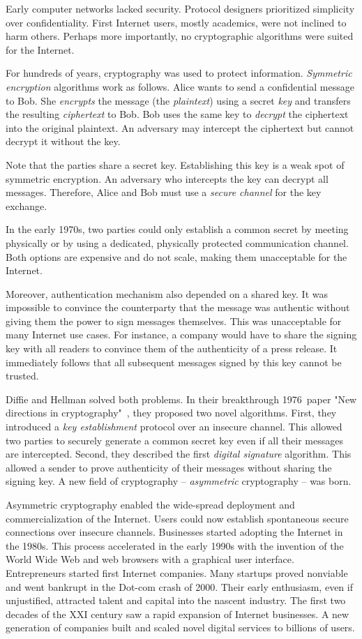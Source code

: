 Early computer networks lacked security.
Protocol designers prioritized simplicity over confidentiality.
First Internet users, mostly academics, were not inclined to harm others.
Perhaps more importantly, no cryptographic algorithms were suited for the Internet.

For hundreds of years, cryptography was used to protect information.
\textit{Symmetric encryption} algorithms work as follows.
Alice wants to send a confidential message to Bob.
She \textit{encrypts} the message (the \textit{plaintext}) using a secret \textit{key} and transfers the resulting \textit{ciphertext} to Bob.
Bob uses the same key to \textit{decrypt} the ciphertext into the original plaintext.
An adversary may intercept the ciphertext but cannot decrypt it without the key.

Note that the parties share a secret key.
Establishing this key is a weak spot of symmetric encryption.
An adversary who intercepts the key can decrypt all messages.
Therefore, Alice and Bob must use a \textit{secure channel} for the key exchange.

In the early 1970s, two parties could only establish a common secret by meeting physically or by using a dedicated, physically protected communication channel.
Both options are expensive and do not scale, making them unacceptable for the Internet.

Moreover, authentication mechanism also depended on a shared key.
It was impossible to convince the counterparty that the message was authentic without giving them the power to sign messages themselves.
This was unacceptable for many Internet use cases.
For instance, a company would have to share the signing key with all readers to convince them of the authenticity of a press release.
It immediately follows that all subsequent messages signed by this key cannot be trusted.

Diffie and Hellman solved both problems.
In their breakthrough 1976~paper "New directions in cryptography"~\cite{Diffie1976}, they proposed two novel algorithms.
First, they introduced a \textit{key establishment} protocol over an insecure channel.
This allowed two parties to securely generate a common secret key even if all their messages are intercepted.
Second, they described the first \textit{digital signature} algorithm.
This allowed a sender to prove authenticity of their messages without sharing the signing key.
A new field of cryptography -- \textit{asymmetric} cryptography -- was born.

Asymmetric cryptography enabled the wide-spread deployment and commercialization of the Internet.
Users could now establish spontaneous secure connections over insecure channels.
Businesses started adopting the Internet in the 1980s.
This process accelerated in the early 1990s with the invention of the World Wide Web and web browsers with a graphical user interface.
Entrepreneurs started first Internet companies.
Many startups proved nonviable and went bankrupt in the Dot-com crash of 2000.
Their early enthusiasm, even if unjustified, attracted talent and capital into the nascent industry.
The first two decades of the XXI century saw a rapid expansion of Internet businesses.
A new generation of companies built and scaled novel digital services to billions of users.

